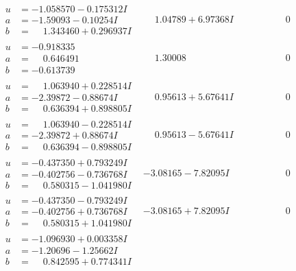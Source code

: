 \documentclass[1p]{elsarticle_modified}
\theoremstyle{definition}
\begin{document}
$$\begin{array}{c|c|c}
\begin{aligned}
u &= -1.058570 - 0.175312 I \\
a &= -1.59093 - 0.10254 I \\
b &= \phantom{-}1.343460 + 0.296937 I\end{aligned}
 & \phantom{-}1.04789 + 6.97368 I & \phantom{-0.000000 } 0 \\ \hline\begin{aligned}
u &= -0.918335\phantom{ +0.000000I} \\
a &= \phantom{-}0.646491\phantom{ +0.000000I} \\
b &= -0.613739\phantom{ +0.000000I}\end{aligned}
 & \phantom{-}1.30008\phantom{ +0.000000I} & \phantom{-0.000000 } 0 \\ \hline\begin{aligned}
u &= \phantom{-}1.063940 + 0.228514 I \\
a &= -2.39872 - 0.88674 I \\
b &= \phantom{-}0.636394 + 0.898805 I\end{aligned}
 & \phantom{-}0.95613 + 5.67641 I & \phantom{-0.000000 } 0 \\ \hline\begin{aligned}
u &= \phantom{-}1.063940 - 0.228514 I \\
a &= -2.39872 + 0.88674 I \\
b &= \phantom{-}0.636394 - 0.898805 I\end{aligned}
 & \phantom{-}0.95613 - 5.67641 I & \phantom{-0.000000 } 0 \\ \hline\begin{aligned}
u &= -0.437350 + 0.793249 I \\
a &= -0.402756 - 0.736768 I \\
b &= \phantom{-}0.580315 - 1.041980 I\end{aligned}
 & -3.08165 - 7.82095 I & \phantom{-0.000000 } 0 \\ \hline\begin{aligned}
u &= -0.437350 - 0.793249 I \\
a &= -0.402756 + 0.736768 I \\
b &= \phantom{-}0.580315 + 1.041980 I\end{aligned}
 & -3.08165 + 7.82095 I & \phantom{-0.000000 } 0 \\ \hline\begin{aligned}
u &= -1.096930 + 0.003358 I \\
a &= -1.20696 - 1.25662 I \\
b &= \phantom{-}0.842595 + 0.774341 I\end{aligned}

\end{array}$$
\end{document}
